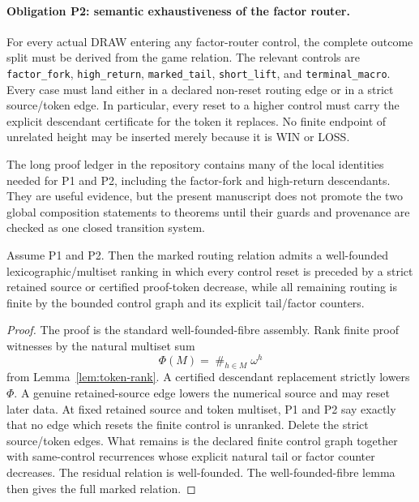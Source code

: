 \paragraph{Obligation P2: semantic exhaustiveness of the factor router.}
For every actual DRAW entering any factor-router control, the complete
outcome split must be derived from the game relation.  The relevant controls
are \texttt{factor\_fork}, \texttt{high\_return},
\texttt{marked\_tail}, \texttt{short\_lift}, and
\texttt{terminal\_macro}.  Every case must land either in a declared
non-reset routing edge or in a strict source/token edge.  In particular, every reset to a higher control
must carry the explicit descendant certificate for the token it replaces.
No finite endpoint of unrelated height may be inserted merely because it is
WIN or LOSS.

The long proof ledger in the repository contains many of the local identities
needed for P1 and P2, including the factor-fork and high-return descendants.
They are useful evidence, but the present manuscript does not promote the two
global composition statements to theorems until their guards and provenance
are checked as one closed transition system.

\begin{proposition}\label{prop:conditional-routing}
Assume P1 and P2.  Then the marked routing relation admits a well-founded
lexicographic/multiset ranking in which every control reset is preceded by a
strict retained source or certified proof-token decrease, while all remaining
routing is finite by the bounded control graph and its explicit tail/factor
counters.
\end{proposition}

\begin{proof}
The proof is the standard well-founded-fibre assembly.  Rank finite proof
witnesses by the natural multiset sum
\[
 \Phi(M)=\mathop{\#}_{h\in M}\omega^h
\]
from Lemma~\ref{lem:token-rank}.  A certified descendant replacement strictly
lowers $\Phi$.  A genuine retained-source edge lowers the numerical source and
may reset later data.  At fixed retained source and token multiset, P1 and P2
say exactly that no edge which resets the finite control is unranked.  Delete
the strict source/token edges.  What remains is the declared finite control
graph together with same-control recurrences whose explicit natural tail or
factor counter decreases.  The residual relation is well-founded.  The
well-founded-fibre lemma then gives the full marked relation.
\end{proof}


